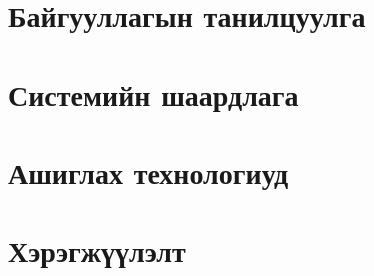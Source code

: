 \chapter{Байгууллагын танилцуулга}

\chapter{Системийн шаардлага}

\chapter{Ашиглах технологиуд}

\chapter{Хэрэгжүүлэлт}

